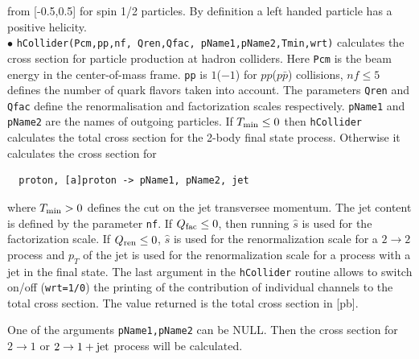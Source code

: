 \documentclass[12pt,a4paper]{article}
\begin{document}
from [-0.5,0.5]  for spin 1/2 particles.
By definition a left handed particle has a positive
helicity. \\[2mm]
%
\noindent$\bullet$ \verb|hCollider(Pcm,pp,nf, Qren,Qfac, pName1,pName2,Tmin,wrt)| 
calculates the cross
section for particle production at hadron colliders. Here \verb|Pcm| 
is the beam energy  in the center-of-mass frame. \verb|pp| is
$1$($-1$) for $pp$($p\bar{p}$) collisions, $ nf \le 5$  defines the
number of quark flavors taken into account.
The parameters  {\tt Qren} and  {\tt Qfac} define the renormalisation and factorization
 scales respectively. {\tt pName1} and {\tt pName2} are the names of outgoing
particles. If $T_{\rm min} \le 0 $ then {\tt hCollider} calculates the total  
cross section for the 2-body final state  process. Otherwise it calculates the cross
section for
\begin{verbatim}
  proton, [a]proton -> pName1, pName2, jet
\end{verbatim} 
where $ T_{\rm min}>0 $  defines the cut on the  jet transversee momentum. 
The jet content is defined by the  parameter \verb|nf|. 
If $Q_{\rm fac} \le 0 $, then  running  $\hat{s}$ is used for the
factorization  scale. If  $Q_{\rm ren} \le 0 $,  
$\hat{s}$ is used for the renormalization scale for a $2\to2$ process and $p_{T}$ of the jet is used for the renormalization scale for a process with a jet in the final state.
The last argument in the  {\tt hCollider} routine allows to switch
on/off ({\tt wrt=1/0}) the printing  of the contribution of individual channels to the total
cross section.   The value returned  is the total  cross section in [pb]. 


One of the arguments \verb|pName1,pName2| can be NULL. Then the cross section for $2\to1$   or $2\to1 + {\rm jet}$
process will be calculated. 
\end{document}
